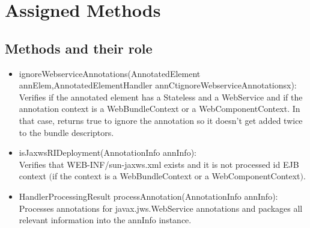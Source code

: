 \section{Assigned Methods}

	\subsection{Methods and their role}
		\begin{itemize}
			\item ignoreWebserviceAnnotations(AnnotatedElement annElem,AnnotatedElementHandler annCtignoreWebserviceAnnotationsx): \\ \hfill
			Verifies if the annotated element has a Stateless and a WebService and if the annotation
			context is a WebBundleContext or a WebComponentContext. In that case, returns true to ignore the annotation so it doesn't get added twice to the bundle descriptors.
			\item isJaxwsRIDeployment(AnnotationInfo annInfo): \\ \hfill
			Verifies that WEB-INF/sun-jaxws.xml exists and it is not processed id EJB context $($if the context is a WebBundleContext or a WebComponentContext$)$. 
			\item HandlerProcessingResult processAnnotation(AnnotationInfo annInfo): \\ \hfill
			Processes annotations for javax.jws.WebService annotations and packages all relevant information into the annInfo instance. 
			\end{itemize}
